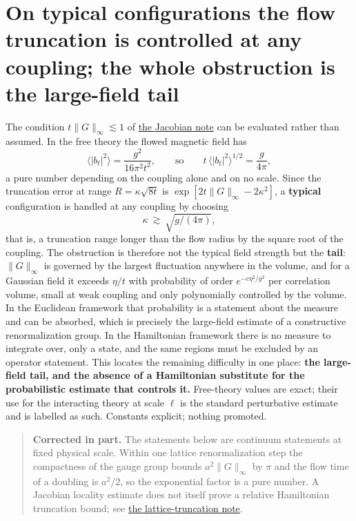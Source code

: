 \documentclass[11pt,a4paper]{article}
\begin{document}
\hypertarget{on-typical-configurations-the-flow-truncation-is-controlled-at-any-coupling-the-whole-obstruction-is-the-large-field-tail}{%
\section{On typical configurations the flow truncation is controlled at
any coupling; the whole obstruction is the large-field
tail}\label{on-typical-configurations-the-flow-truncation-is-controlled-at-any-coupling-the-whole-obstruction-is-the-large-field-tail}}

The condition \(t\|G\|_\infty\lesssim1\) of
\href{flow-jacobian-truncation-error.md}{the Jacobian note} can be
evaluated rather than assumed. In the free theory the flowed magnetic
field has \[\big\langle|b_t|^2\big\rangle=\frac{g^2}{16\pi^2t^2},
\qquad\text{so}\qquad t\,\big\langle|b_t|^2\big\rangle^{1/2}=\frac{g}{4\pi},\]
a pure number depending on the coupling alone and on no scale. Since the
truncation error at range \(R=\kappa\sqrt{8t}\) is
\(\exp[2t\|G\|_\infty-2\kappa^2]\), a \textbf{typical} configuration is
handled at any coupling by choosing
\[\kappa\ \gtrsim\ \sqrt{g/(4\pi)},\] that is, a truncation range longer
than the flow radius by the square root of the coupling. The obstruction
is therefore not the typical field strength but the \textbf{tail}:
\(\|G\|_\infty\) is governed by the largest fluctuation anywhere in the
volume, and for a Gaussian field it exceeds \(\eta/t\) with probability
of order \(e^{-c\eta^2/g^2}\) per correlation volume, small at weak
coupling and only polynomially controlled by the volume. In the
Euclidean framework that probability is a statement about the measure
and can be absorbed, which is precisely the large-field estimate of a
constructive renormalization group. In the Hamiltonian framework there
is no measure to integrate over, only a state, and the same regions must
be excluded by an operator statement. This locates the remaining
difficulty in one place: \textbf{the large-field tail, and the absence
of a Hamiltonian substitute for the probabilistic estimate that controls
it.} Free-theory values are exact; their use for the interacting theory
at scale \(\ell\) is the standard perturbative estimate and is labelled
as such. Constants explicit; nothing promoted.

\begin{quote}
\textbf{Corrected in part.} The statements below are continuum
statements at fixed physical scale. Within one lattice renormalization
step the compactness of the gauge group bounds \(a^2\|G\|_\infty\) by
\(\pi\) and the flow time of a doubling is \(a^2/2\), so the exponential
factor is a pure number. A Jacobian locality estimate does not itself
prove a relative Hamiltonian truncation bound; see
\href{flow-conjugation-truncation.md}{the lattice-truncation note}.
\end{quote}
\end{document}
